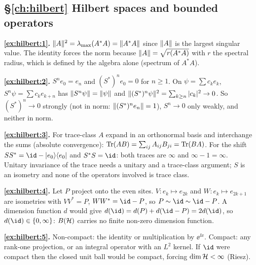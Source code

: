 {\subsection*{\S\ref{ch:hilbert} Hilbert spaces and bounded operators}
\textbf{\ref{ex:hilbert:1}.} $\lVert A\rVert^2=\lambda_{\max}(A^*A)=\lVert A^*A\rVert$ since $\lVert A\rVert$ is the largest singular value. The identity forces the norm because $\lVert A\rVert=\sqrt{r(A^*A)}$ with $r$ the spectral radius, which is defined by the algebra alone (spectrum of $A^*A$).\par
\textbf{\ref{ex:hilbert:2}.} $S^ne_0=e_n$ and $(S^*)^ne_0=0$ for $n\ge1$. On $\psi=\sum c_ke_k$, $S^n\psi=\sum c_ke_{k+n}$ has $\lVert S^n\psi\rVert=\lVert \psi\rVert$ and $\lVert (S^*)^n\psi\rVert^2=\sum_{k\ge n}|c_k|^2\to0$. So $(S^*)^n\to0$ strongly (not in norm: $\lVert (S^*)^ne_n\rVert=1$), $S^n\to0$ only weakly, and neither in norm.\par
\textbf{\ref{ex:hilbert:3}.} For trace-class $A$ expand in an orthonormal basis and interchange the sums (absolute convergence): $\operatorname{Tr}(AB)=\sum_{ij}A_{ij}B_{ji}=\operatorname{Tr}(BA)$. For the shift $SS^*=\id-|e_0\rangle\langle e_0|$ and $S^*S=\id$: both traces are $\infty$ and $\infty-1=\infty$. Unitary invariance of the trace needs a unitary and a trace-class argument; $S$ is an isometry and none of the operators involved is trace class.\par
\textbf{\ref{ex:hilbert:4}.} Let $P$ project onto the even sites. $V:e_k\mapsto e_{2k}$ and $W:e_k\mapsto e_{2k+1}$ are isometries with $VV^*=P$, $WW^*=\id-P$, so $P\sim\id\sim\id-P$. A dimension function $d$ would give $d(\id)=d(P)+d(\id-P)=2d(\id)$, so $d(\id)\in\{0,\infty\}$: $B(\mathcal{H})$ carries no finite non-zero dimension function.\par
\textbf{\ref{ex:hilbert:5}.} Non-compact: the identity or multiplication by $\ee^{\ii x}$. Compact: any rank-one projection, or an integral operator with an $L^2$ kernel. If $\id$ were compact then the closed unit ball would be compact, forcing $\dim\mathcal{H}<\infty$ (Riesz).\par

}
